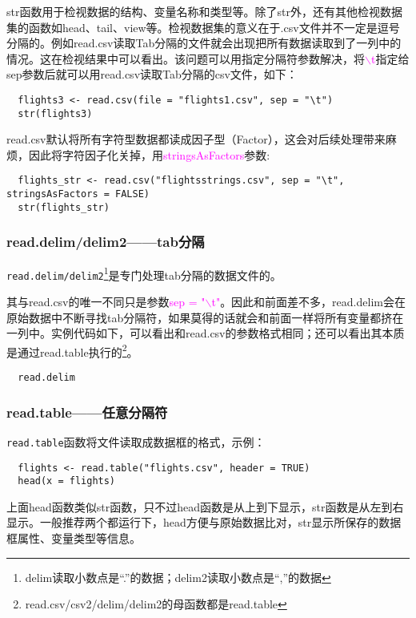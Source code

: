 \documentclass[cn,hazy,blue,14pt,screen]{elegantnote}
\begin{document}
str函数用于检视数据的结构、变量名称和类型等。除了str外，还有其他检视数据集的函数如head、tail、view等。检视数据集的意义在于.csv文件并不一定是逗号分隔的。例如read.csv读取Tab分隔的文件就会出现把所有数据读取到了一列中的情况。这在检视结果中可以看出。该问题可以用指定分隔符参数解决，将\textcolor{magenta}{$\backslash$t}指定给sep参数后就可以用read.csv读取Tab分隔的csv文件，如下：

\begin{lstlisting}
  flights3 <- read.csv(file = "flights1.csv", sep = "\t")
  str(flights3)
\end{lstlisting}

read.csv默认将所有字符型数据都读成因子型（Factor），这会对后续处理带来麻烦，因此将字符因子化关掉，用\textcolor{magenta}{stringsAsFactors}参数:

\begin{lstlisting}
  flights_str <- read.csv("flightsstrings.csv", sep = "\t", stringsAsFactors = FALSE)
  str(flights_str)
\end{lstlisting}

\subsubsection{read.delim/delim2——tab分隔}
\lstinline{read.delim/delim2}\footnote{delim读取小数点是“.”的数据；delim2读取小数点是“,”的数据}是专门处理tab分隔的数据文件的。

其与read.csv的唯一不同只是参数\textcolor{magenta}{sep = "$\backslash$t"}。因此和前面差不多，read.delim会在原始数据中不断寻找tab分隔符，如果莫得的话就会和前面一样将所有变量都挤在一列中。实例代码如下，可以看出和read.csv的参数格式相同；还可以看出其本质是通过read.table执行的\footnote{read.csv/csv2/delim/delim2的母函数都是read.table}。

\begin{lstlisting}
  read.delim
\end{lstlisting}

\subsubsection{read.table——任意分隔符}

\lstinline{read.table}函数将文件读取成数据框的格式，示例：

\begin{lstlisting}
  flights <- read.table("flights.csv", header = TRUE)
  head(x = flights)
\end{lstlisting}

上面head函数类似str函数，只不过head函数是从上到下显示，str函数是从左到右显示。一般推荐两个都运行下，head方便与原始数据比对，str显示所保存的数据框属性、变量类型等信息。
\end{document}
